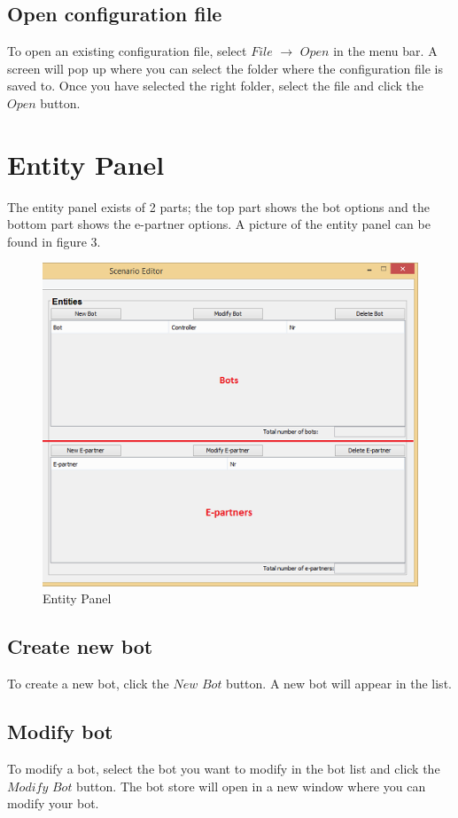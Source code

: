 \documentclass[a4paper]{article}
\begin{document}
\subsection{Open configuration file}
To open an existing configuration file, select $File$ $\to$ $Open$ in the menu bar. A screen will pop up where you can select the folder where the configuration file is saved to. Once you have selected the right folder, select the file and click the $Open$ button.
\pagebreak
\section{Entity Panel}
The entity panel exists of 2 parts; the top part shows the bot options and the bottom part shows the e-partner options. A picture of the entity panel can be found in figure 3.
\begin{figure}
\begin{center}
\includegraphics{bot.png}
\end{center}
\caption{Entity Panel}
\end{figure}
\subsection{Create new bot}
To create a new bot, click the $New$ $Bot$ button. A new bot will appear in the list.%

\subsection{Modify bot}
To modify a bot, select the bot you want to modify in the bot list and click the $Modify$ $Bot$ button. The bot store will open in a new window where you can modify your bot.
\end{document}
